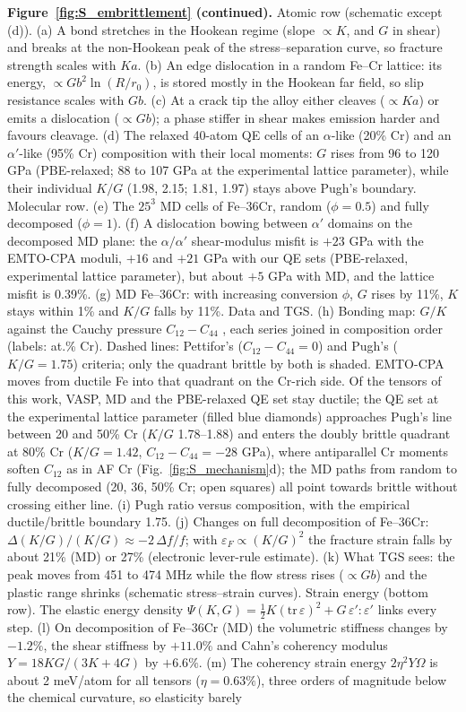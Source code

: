 \documentclass[final,3p,times]{elsarticle}
\begin{document}
\clearpage
\noindent\textbf{Figure~\ref{fig:S_embrittlement} (continued).} Atomic row (schematic except (d)). (a) A bond stretches in the Hookean regime (slope $\propto K$, and $G$ in shear) and breaks at the non-Hookean peak of the stress--separation curve, so fracture strength scales with $Ka$. (b) An edge dislocation in a random Fe--Cr lattice: its energy, $\propto Gb^2\ln(R/r_0)$, is stored mostly in the Hookean far field, so slip resistance scales with $Gb$. (c) At a crack tip the alloy either cleaves ($\propto Ka$) or emits a dislocation ($\propto Gb$); a phase stiffer in shear makes emission harder and favours cleavage. (d) The relaxed 40-atom QE cells of an $\alpha$-like (20\% Cr) and an $\alpha'$-like (95\% Cr) composition with their local moments: $G$ rises from 96 to 120 GPa (PBE-relaxed; 88 to 107 GPa at the experimental lattice parameter), while their individual $K/G$ (1.98, 2.15; 1.81, 1.97) stays above Pugh's boundary. Molecular row. (e) The $25^3$ MD cells of Fe--36Cr, random ($\phi=0.5$) and fully decomposed ($\phi=1$). (f) A dislocation bowing between $\alpha'$ domains on the decomposed MD plane: the $\alpha/\alpha'$ shear-modulus misfit is $+23$ GPa with the EMTO-CPA moduli, $+16$ and $+21$ GPa with our QE sets (PBE-relaxed, experimental lattice parameter), but about $+5$ GPa with MD, and the lattice misfit is 0.39\%. (g) MD Fe--36Cr: with increasing conversion $\phi$, $G$ rises by 11\%, $K$ stays within 1\% and $K/G$ falls by 11\%. Data and TGS. (h) Bonding map: $G/K$ against the Cauchy pressure $C_{12}-C_{44}$ \cite{pettifor1992theoretical}, each series joined in composition order (labels: at.\% Cr). Dashed lines: Pettifor's ($C_{12}-C_{44}=0$) and Pugh's ($K/G=1.75$) criteria; only the quadrant brittle by both is shaded. EMTO-CPA moves from ductile Fe into that quadrant on the Cr-rich side. Of the tensors of this work, VASP, MD and the PBE-relaxed QE set stay ductile; the QE set at the experimental lattice parameter (filled blue diamonds) approaches Pugh's line between 20 and 50\% Cr ($K/G$ 1.78--1.88) and enters the doubly brittle quadrant at 80\% Cr ($K/G=1.42$, $C_{12}-C_{44}=-28$ GPa), where antiparallel Cr moments soften $C_{12}$ as in AF Cr (Fig.~\ref{fig:S_mechanism}d); the MD paths from random to fully decomposed (20, 36, 50\% Cr; open squares) all point towards brittle without crossing either line. (i) Pugh ratio versus composition, with the empirical ductile/brittle boundary 1.75. (j) Changes on full decomposition of Fe--36Cr: $\Delta(K/G)/(K/G)\approx-2\,\Delta f/f$; with $\varepsilon_F\propto(K/G)^2$ the fracture strain falls by about 21\% (MD) or 27\% (electronic lever-rule estimate). (k) What TGS sees: the peak moves from 451 to 474 MHz while the flow stress rises ($\propto Gb$) and the plastic range shrinks (schematic stress--strain curves). Strain energy (bottom row). The elastic energy density $\Psi(K,G)=\frac12K(\mathrm{tr}\,\varepsilon)^2+G\,\varepsilon':\varepsilon'$ links every step. (l) On decomposition of Fe--36Cr (MD) the volumetric stiffness changes by $-1.2\%$, the shear stiffness by $+11.0\%$ and Cahn's coherency modulus $Y=18KG/(3K+4G)$ by $+6.6\%$. (m) The coherency strain energy $2\eta^2Y\Omega$ is about 2 meV/atom for all tensors ($\eta=0.63\%$), three orders of magnitude below the chemical curvature, so elasticity barely 
\end{document}
